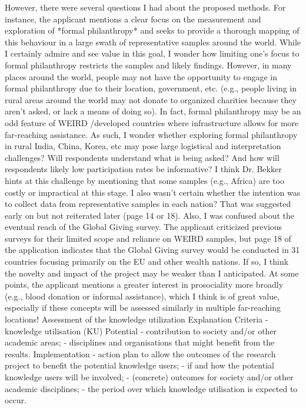 \documentclass[twocolumn, serif, rga, numeric]{jote-article}
\begin{document}
However, there were several questions I had about the proposed methods. For instance, the applicant mentions a clear focus on the measurement and exploration of *formal philanthropy* and seeks to provide a thorough mapping of this behaviour in a large swath of representative samples around the world. While I certainly admire and see value in this goal, I wonder how limiting one's focus to formal philanthropy restricts the samples and likely findings. However, in many places around the world, people may not have the opportunity to engage in formal philanthropy due to their location, government, etc. (e.g., people living in rural areas around the world may not donate to organized charities because they                                             aren't asked, or lack a means of doing so). In fact, formal philanthropy may be an odd feature of WEIRD /developed countries where infrastructure allows for more far-reaching assistance. As such, I wonder whether exploring formal philanthropy in rural India, China, Korea, etc may pose large logistical and interpretation challenges? Will respondents understand what is being asked? And how will respondents likely low participation rates be informative? I think Dr. Bekker hints at this challenge by mentioning that some samples (e.g., Africa) are too costly or impractical at this stage.
I also wasn't certain whether the intention was to collect data from representative samples in each nation? That was suggested early on but not reiterated later (page 14 or 18).
Also, I was confused about the eventual reach of the Global Giving survey. The applicant criticized previous surveys for their limited scope and reliance on WEIRD samples, but page 18 of the application indicates that the Global Giving survey would be conducted in 31 countries focusing primarily on the EU and other wealth nations. If so, I think the novelty and impact of the project may be weaker than I anticipated.
At some points, the applicant mentions a greater interest in prosociality more broadly (e.g., blood donation or informal assistance), which I think is of great value, especially if these concepts will be assessed similarly in multiple far-reaching locations!
Assessment of the knowledge utilization
Explanation
Criteria - knowledge utilisation (KU) Potential - contribution to society and/or other academic areas; - disciplines and organisations that might benefit from the results. Implementation - action plan to allow the outcomes of the research project to benefit the potential knowledge users; - if and how the potential knowledge users will be involved; - (concrete) outcomes for society and/or other academic disciplines; - the period over which knowledge utilisation is expected to occur.
\end{document}
